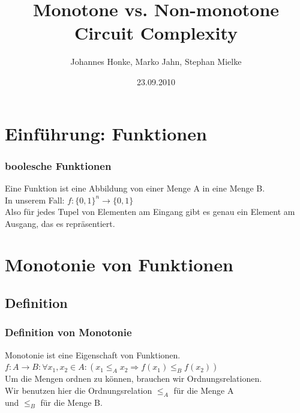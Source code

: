 \documentclass[hyperref={pdfpagelabels=false}]{beamer} %
\title{Monotone vs. Non-monotone Circuit Complexity}
\author{Johannes Honke, Marko Jahn, Stephan Mielke}
\institute{BTU-Cottbus}
\date{23.09.2010}
\begin{document}
  \begin{frame}[plain]
    \titlepage
    \tableofcontents
  \end{frame}

  \section{Einführung: Funktionen}
  \begin{frame} %
    \frametitle{boolesche Funktionen}
    Eine Funktion ist eine Abbildung von einer Menge A in eine Menge B.\\
    In unserem Fall:
    $f: \{0,1\}^{n} \rightarrow \{0,1\}$ \\
    Also für jedes Tupel von Elementen am Eingang gibt es genau ein Element am Ausgang, das es repräsentiert.
  \end{frame}

  \section{Monotonie von Funktionen}
  \subsection*{Definition}
  \begin{frame}%
    \frametitle{Definition von Monotonie}
    Monotonie ist eine Eigenschaft von Funktionen.\\
    $f:A \rightarrow B: \forall x_1,x_2 \in A : (x_1 \leq_A x_2 \Rightarrow f(x_1) \leq_B f(x_2))$\\
    Um die Mengen ordnen zu können, brauchen wir Ordnungsrelationen.\\
    Wir benutzen hier die Ordnungsrelation $\leq_A$ für die Menge A\\
    und $\leq_B$ für die Menge B.\\
  \end{frame}
\end{document}
